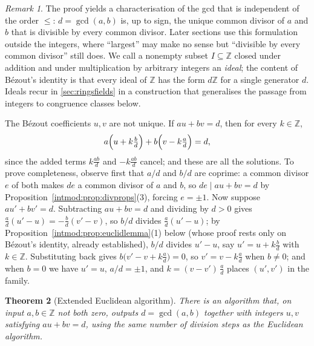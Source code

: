 \documentclass[11pt,a4paper]{article}
\newtheorem{theorem}{Theorem}[section]
\theoremstyle{definition}
\theoremstyle{remark}
\newtheorem{remark}[theorem]{Remark}
\newcommand{\Z}{\ensuremath{\mathbb{Z}}}
\begin{document}
\begin{remark}\label{intmod:rem:strongestgcd}
The proof yields a characterisation of the gcd that is independent of the
order \(\le\): \(d=\gcd(a,b)\) is, up to sign, the unique common divisor of
\(a\) and \(b\) that is divisible by every common divisor. Later sections use
this formulation outside the integers, where ``largest'' may make no sense
but ``divisible by every common divisor'' still does.
We call a nonempty subset \(I\subseteq\Z\) closed under addition and under
multiplication by arbitrary integers an \emph{ideal}; the content of
B\'ezout's identity is that every ideal of \(\Z\) has the form \(d\Z\) for a
single generator \(d\). Ideals recur in \cref{sec:ringsfields} in a
construction that generalises the passage from integers to congruence classes
below.
\end{remark}

The B\'ezout coefficients \(u,v\) are not unique. If \(au+bv=d\), then for
every \(k\in\Z\),
\[
a\Bigl(u+k\tfrac{b}{d}\Bigr)+b\Bigl(v-k\tfrac{a}{d}\Bigr)=d,
\]
since the added terms \(k\tfrac{ab}{d}\) and \(-k\tfrac{ab}{d}\) cancel; and
these are all the solutions. To prove completeness, observe first that
\(a/d\) and \(b/d\) are coprime: a common divisor \(e\) of both makes \(de\) a
common divisor of \(a\) and \(b\), so \(de\mid au+bv=d\) by
Proposition~\ref{intmod:prop:divprops}(3), forcing \(e=\pm 1\). Now suppose
\(au'+bv'=d\). Subtracting \(au+bv=d\) and dividing by \(d>0\) gives
\(\tfrac{a}{d}(u'-u)=-\tfrac{b}{d}(v'-v)\), so \(b/d\) divides
\(\tfrac{a}{d}(u'-u)\); by Proposition~\ref{intmod:prop:euclidlemma}(1)
below (whose proof rests only on B\'ezout's identity, already established),
\(b/d\) divides \(u'-u\), say \(u'=u+k\tfrac{b}{d}\) with \(k\in\Z\).
Substituting back gives \(b\bigl(v'-v+k\tfrac{a}{d}\bigr)=0\), so
\(v'=v-k\tfrac{a}{d}\) when \(b\neq 0\); and when \(b=0\) we have \(u'=u\),
\(a/d=\pm 1\), and \(k=(v-v')\,\tfrac{a}{d}\) places \((u',v')\) in the
family.

\begin{theorem}[Extended Euclidean algorithm]\label{intmod:thm:exteuclid}
There is an algorithm that, on input \(a,b\in\Z\) not both zero, outputs
\(d=\gcd(a,b)\) together with integers \(u,v\) satisfying \(au+bv=d\), using
the same number of division steps as the Euclidean algorithm.
\end{theorem}
\end{document}
